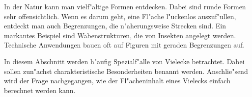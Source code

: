 



\begin{MIntro}
In der Natur kann man vielf"altige Formen entdecken. Dabei sind runde Formen
sehr offensichtlich.  Wenn es darum geht, eine Fl"ache l"uckenlos auszuf"ullen, 
entdeckt man auch Begrenzungen, die n"aherungsweise Strecken sind. Ein markantes
Beispiel sind Wabenstrukturen, die von Insekten angelegt werden.
Technische Anwendungen bauen oft auf Figuren mit geraden Begrenzungen auf.

In diesem Abschnitt werden h"aufig Spezialf"alle von Vielecke betrachtet. 
Dabei sollen zun"achst charakteristische Besonderheiten benannt werden.
Anschlie"send wird der Frage nachgegangen, wie der Fl"acheninhalt eines 
Vielecks einfach berechnet werden kann. 

\end{MIntro}

\ifttm\relax\else\newpage\fi

